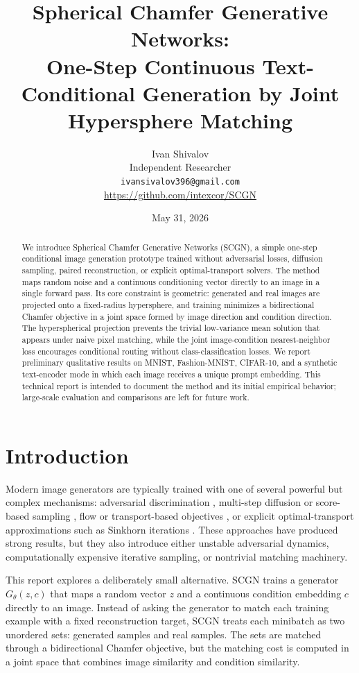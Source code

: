\documentclass[11pt]{article}
\title{Spherical Chamfer Generative Networks:\\
One-Step Continuous Text-Conditional Generation by Joint Hypersphere Matching}
\author{
Ivan Shivalov\\
Independent Researcher\\
\texttt{ivansivalov396@gmail.com}\\
\url{https://github.com/intexcor/SCGN}
}
\date{May 31, 2026}
\begin{document}
\maketitle

\begin{abstract}
We introduce Spherical Chamfer Generative Networks (SCGN), a simple one-step
conditional image generation prototype trained without adversarial losses,
diffusion sampling, paired reconstruction, or explicit optimal-transport
solvers. The method maps random noise and a continuous conditioning vector
directly to an image in a single forward pass. Its core constraint is geometric:
generated and real images are projected onto a fixed-radius hypersphere, and
training minimizes a bidirectional Chamfer objective in a joint space formed by
image direction and condition direction. The hyperspherical projection prevents
the trivial low-variance mean solution that appears under naive pixel matching,
while the joint image-condition nearest-neighbor loss encourages conditional
routing without class-classification losses. We report preliminary qualitative
results on MNIST, Fashion-MNIST, CIFAR-10, and a synthetic text-encoder mode in
which each image receives a unique prompt embedding. This technical report is
intended to document the method and its initial empirical behavior; large-scale
evaluation and comparisons are left for future work.
\end{abstract}

\section{Introduction}
Modern image generators are typically trained with one of several powerful but
complex mechanisms: adversarial discrimination \cite{goodfellow2014generative},
multi-step diffusion or score-based sampling \cite{ho2020denoising,
song2021score}, flow or transport-based objectives \cite{lipman2022flow,
liu2022flow}, or explicit optimal-transport approximations such as Sinkhorn
iterations \cite{cuturi2013sinkhorn}. These approaches have produced strong
results, but they also introduce either unstable adversarial dynamics,
computationally expensive iterative sampling, or nontrivial matching machinery.

This report explores a deliberately small alternative. SCGN trains a generator
$G_\theta(z,c)$ that maps a random vector $z$ and a continuous condition
embedding $c$ directly to an image. Instead of asking the generator to match
each training example with a fixed reconstruction target, SCGN treats each
minibatch as two unordered sets: generated samples and real samples. The sets
are matched through a bidirectional Chamfer objective, but the matching cost is
computed in a joint space that combines image similarity and condition
similarity.
\end{document}

